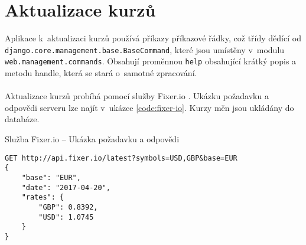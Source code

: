 \section{Aktualizace kurzů}
Aplikace k~aktualizaci kurzů používá příkazy příkazové řádky, což třídy dědící od \texttt{django.core.management.base.BaseCommand}, které jsou umístěny v~modulu \texttt{web.management.commands}. Obsahují proměnnou \texttt{help} obsahující krátký popis a metodu handle, která se stará o~samotné zpracování.
\\\\
Aktualizace kurzů probíhá pomocí služby Fixer.io \cite{fixer-io}. Ukázku požadavku a odpovědi serveru lze najít v~ukázce \ref{code:fixer-io}. Kurzy měn jsou ukládány do databáze.

\begin{listing}[h]
\caption{\label{code:fixer-io}Služba Fixer.io -- Ukázka požadavku a odpovědi}
\begin{verbatim}
GET http://api.fixer.io/latest?symbols=USD,GBP&base=EUR
{
    "base": "EUR",
    "date": "2017-04-20",
    "rates": {
        "GBP": 0.8392,
        "USD": 1.0745
    }
}
\end{verbatim}
\end{listing}
